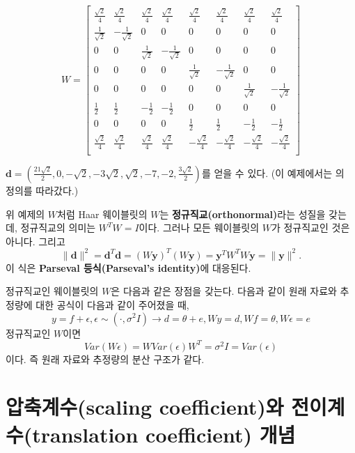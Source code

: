 \documentclass[b5paper,]{scrbook}
\theoremstyle{plain}
\theoremstyle{definition}
\numberwithin{equation}{section}
\begin{document}
\[
W =
\begin{bmatrix}
\frac{\sqrt{2}}{4} & \frac{\sqrt{2}}{4} & \frac{\sqrt{2}}{4} & \frac{\sqrt{2}}{4} & \frac{\sqrt{2}}{4} & \frac{\sqrt{2}}{4} & \frac{\sqrt{2}}{4} & \frac{\sqrt{2}}{4}\\
\frac{1}{\sqrt{2}} & -\frac{1}{\sqrt{2}} & 0 & 0 & 0 & 0 & 0 & 0\\
 0 & 0 & \frac{1}{\sqrt{2}} & -\frac{1}{\sqrt{2}} & 0 & 0 & 0 & 0\\
 0 & 0 & 0 & 0 &  \frac{1}{\sqrt{2}} & -\frac{1}{\sqrt{2}} & 0 & 0\\
 0 & 0 & 0 & 0 & 0 & 0 &  \frac{1}{\sqrt{2}} & -\frac{1}{\sqrt{2}}\\
 \frac{1}{2} & \frac{1}{2} & -\frac{1}{2} & -\frac{1}{2} & 0 & 0 & 0 & 0 \\
 0 & 0 & 0 & 0 &  \frac{1}{2} & \frac{1}{2} & -\frac{1}{2} & -\frac{1}{2}\\
 \frac{\sqrt{2}}{4} & \frac{\sqrt{2}}{4} & \frac{\sqrt{2}}{4} & \frac{\sqrt{2}}{4} & -\frac{\sqrt{2}}{4} & -\frac{\sqrt{2}}{4} & -\frac{\sqrt{2}}{4} & -\frac{\sqrt{2}}{4}\\
\end{bmatrix}
\]

\(\mathbf{d}=(\frac{21\sqrt{2}}{2},0,-\sqrt{2},-3\sqrt{2},\sqrt{2},-7,-2,\frac{3\sqrt{2}}{2})\)를
얻을 수 있다. (이 예제에서는 \citep{Nason2010}의 정의를 따라갔다.)

위 예제의 \(W\)처럼 Haar 웨이블릿의 \(W\)는
\textbf{정규직교(orthonormal)}라는 성질을 갖는데, 정규직교의 의미는
\(W^{T}W=I\)이다. 그러나 모든 웨이블릿의 \(W\)가 정규직교인 것은 아니다.
그리고
\[\| \mathbf{d} \|^{2}=\mathbf{d}^{T}\mathbf{d}=(W\mathbf{y})^{T}(W\mathbf{y})=\mathbf{y}^{T}W^{T}W\mathbf{y}=\| \mathbf{y} \|^{2}.\]
이 식은 \textbf{Parseval 등식(Parseval's identity)}에 대응된다.

정규직교인 웨이블릿의 \(W\)은 다음과 같은 장점을 갖는다. 다음과 같이
원래 자료와 추정량에 대한 공식이 다음과 같이 주어졌을 때,
\[y=f+\epsilon, \epsilon \sim (\cdot, \sigma^{2}I) \rightarrow d=\theta +e, Wy=d, Wf=\theta, W\epsilon=e\]
정규직교인 \(W\)이면
\[Var(W\epsilon)=WVar(\epsilon)W^{T}=\sigma^{2}I=Var(\epsilon)\] 이다.
즉 원래 자료와 추정량의 분산 구조가 같다.

\section{압축계수(scaling coefficient)와 전이계수(translation
coefficient) 개념}\label{scaling-coefficient-translation-coefficient-}
\end{document}

